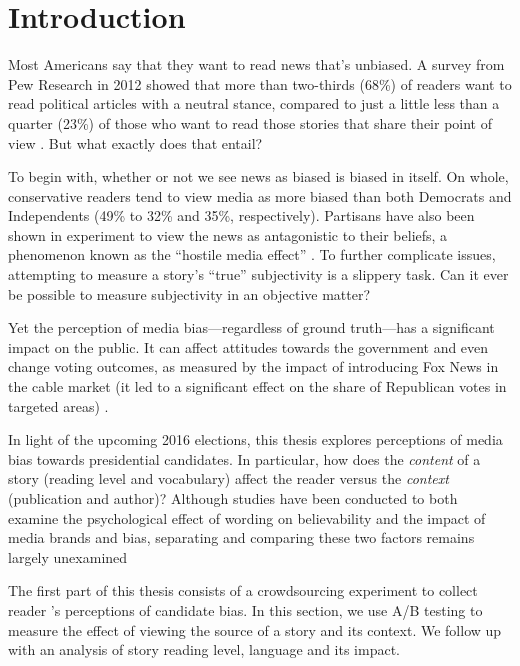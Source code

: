 \chapter{Introduction}
 Most Americans say that they want to read news that's unbiased. A survey from Pew Research in 2012 showed that more than two-thirds (68\%) of readers want to read political articles with a neutral stance, compared to just a little less than a quarter (23\%) of those who want to read those stories that share their point of view \cite{Pew-bias-2012}. But what exactly does that entail?

To begin with, whether or not we see news as biased is biased in itself. On whole, conservative readers tend to view media as more biased than both Democrats and Independents (49\% to 32\% and 35\%, respectively)\cite{Pew-bias-2012}. Partisans have also been shown in experiment to view the news as antagonistic to their beliefs, a phenomenon known as the ``hostile media effect'' \cite{vallone1985hostile}. To further complicate issues, attempting to measure a story's ``true'' subjectivity is a slippery task. Can it ever be possible to measure subjectivity in an objective matter?
 
Yet the perception of media bias---regardless of ground truth---has a significant impact on the public. It can affect attitudes towards the government and even change voting outcomes, as measured by the impact of introducing Fox News in the cable market (it led to a significant effect on the share of Republican votes in targeted areas) \cite{dellavigna2006fox}.

In light of the upcoming 2016 elections, this thesis explores perceptions of media bias towards presidential candidates. In particular, how does the \emph{content} of a story (reading level and vocabulary) affect the reader versus the \emph{context} (publication and author)? Although studies have been conducted to both examine the psychological effect of wording on believability and the impact of media brands and bias, separating and comparing these two factors remains largely unexamined \cite{weisberg2008seductive, baum2008eye}

The first part of this thesis consists of a crowdsourcing experiment to collect reader
's perceptions of candidate bias. In this section, we use A/B testing to measure the effect of viewing the source of a story and its context. We follow up with an analysis of story reading level, language and its impact.
 